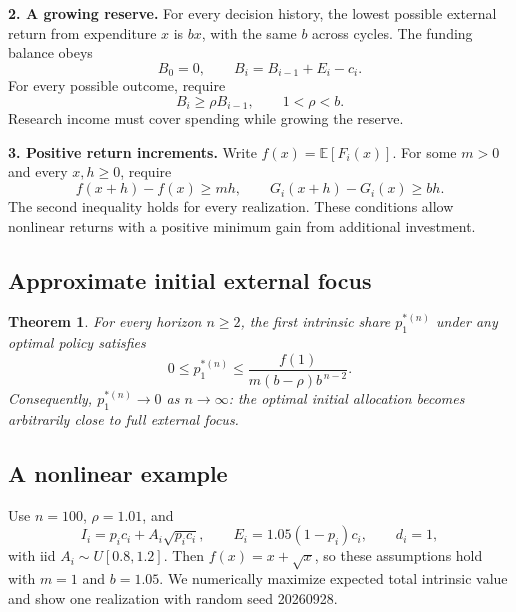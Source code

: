 \documentclass[11pt]{article}
\newtheorem{theorem}{Theorem}
\begin{document}
\textbf{2. A growing reserve.} For every decision history, the lowest possible external return from expenditure $x$ is $bx$, with the same $b$ across cycles. The funding balance obeys
\[
 B_0=0,\qquad B_i=B_{i-1}+E_i-c_i.
\]
For every possible outcome, require
\[
 B_i\ge\rho B_{i-1},\qquad 1<\rho<b.
\]
Research income must cover spending while growing the reserve.

\textbf{3. Positive return increments.} Write $f(x)=\mathbb E[F_i(x)]$. For some $m>0$ and every $x,h\ge0$, require
\[
 f(x+h)-f(x)\ge m h,\qquad G_i(x+h)-G_i(x)\ge b h.
\]
The second inequality holds for every realization. These conditions allow nonlinear returns with a positive minimum gain from additional investment.

\subsection*{Approximate initial external focus}

\begin{theorem}
For every horizon $n\ge2$, the first intrinsic share $p_1^{*(n)}$ under any optimal policy satisfies
\[
 0\le p_1^{*(n)}\le\frac{f(1)}{m(b-\rho)b^{\,n-2}}.
\]
Consequently, $p_1^{*(n)}\to0$ as $n\to\infty$: the optimal initial allocation becomes arbitrarily close to full external focus.
\end{theorem}

\subsection*{A nonlinear example}

Use $n=100$, $\rho=1.01$, and
\[
 I_i=p_i c_i+A_i\sqrt{p_i c_i},\qquad E_i=1.05(1-p_i)c_i,\qquad d_i=1,
\]
with iid $A_i\sim U[0.8,1.2]$. Then $f(x)=x+\sqrt{x}$, so these assumptions hold with $m=1$ and $b=1.05$. We numerically maximize expected total intrinsic value and show one realization with random seed 20260928.
\end{document}
